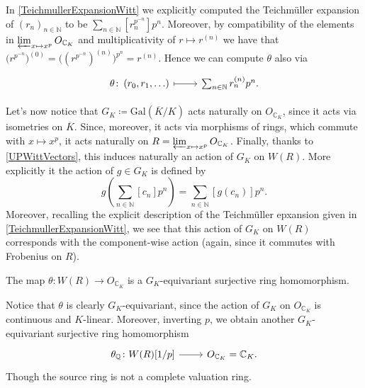 \begin{rem}[]
	In \cref{TeichmullerExpansionWitt} we explicitly computed the Teichmüller
	expansion of $\left( r_n \right)_{n \in \mathbb{N}}$
	to be $\sum_{n \in \mathbb{N} }^{  } [r_n^{p^{-n}}] p^n$.
	Moreover, by compatibility of the elements in $\varprojlim_{x \mapsto x^p} O_{\mathbb{C}_K}$
	and multiplicativity of $r \mapsto r^{(n)}$
	we have that $\big( r^{p^{-n}} \big)^{(0)} = \big( (r^{p^{-n}})^{(n)} \big)^{p^n} =
	r^{(n)}$.
	Hence we can compute $\theta$ also via
	\begin{equation*}
	\begin{tikzcd}
		\theta\colon 
		\left( r_0, r_1, \ldots \right)
		\arrow[r, "", mapsto] &
		\sum_{n \in \mathbb{N} }^{  } r_n^{(n)} p^n
	.\end{tikzcd}
	\end{equation*}
\end{rem}


\begin{rem}[]
	Let's now notice that $G_K \coloneqq \mathrm{Gal}\left( \overline{K} / K \right)$
	acts naturally on $O_{\mathbb{C}_K}$, since it acts via isometries on
	$\overline{K}$.
	Since, moreover, it acts via morphisms of rings, which commute with $x \mapsto x^p$,
	it acts naturally on $R = \varprojlim_{x \mapsto x^p} O_{\mathbb{C}_K}$.
	Finally, thanks to \cref{UPWittVectors}, this induces naturally
	an action of $G_K$ on $W(R)$.
	More explicitly it the action of $g \in G_K$ is defined by
	\begin{equation*}
		g \left( \sum_{n \in \mathbb{N} }^{  } [c_n] p^n \right) =
		\sum_{n \in \mathbb{N} }^{  } [g(c_n)] p^n
	.\end{equation*}
	Moreover, recalling the explicit description of the Teichmüller
	epxansion given in \cref{TeichmullerExpansionWitt}, we see that this
	action of $G_K$ on $W(R)$ corresponds with the component-wise action
	(again, since it commutes with Frobenius on $R$).
\end{rem}


\begin{lem}
	The map $\theta\colon W(R) \to O_{\mathbb{C}_K}$ is a $G_K$-equivariant surjective ring homomorphism.
\end{lem} 


\begin{rem}[]
	Notice that $\theta$ is clearly $G_K$-equivariant, since the action of
	$G_K$ on $O_{\mathbb{C}_K}$ is continuous and $K$-linear.
	Moreover, inverting $p$, we obtain another $G_K$-equivariant surjective ring homomorphism
	\begin{equation*}
	\begin{tikzcd}[row sep = 0ex
		,/tikz/column 1/.append style={anchor=base east}
		,/tikz/column 2/.append style={anchor=base west}]
		\theta_{\mathbb{Q}}\colon W(R)[1/p] \arrow[r, "", rightarrow] &
		O_{\mathbb{C}_K} = \mathbb{C}_K
	.\end{tikzcd}
	\end{equation*} 
	Though the source ring is not a complete valuation ring.
\end{rem}


